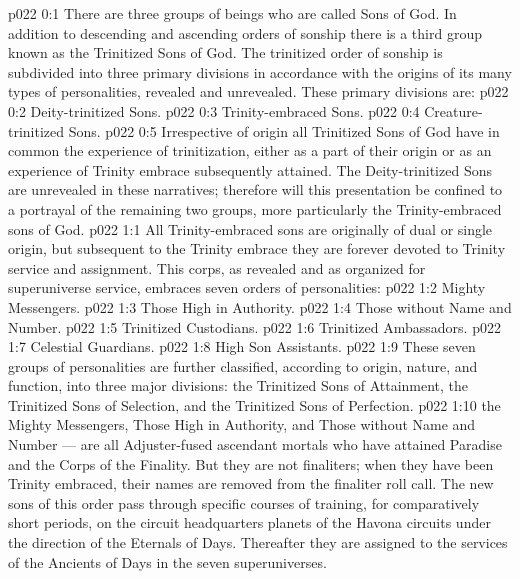 \author{Mighty Messenger}
\vs p022 0:1 There are three groups of beings who are called Sons of God. In addition to descending and ascending orders of sonship there is a third group known as the Trinitized Sons of God. The trinitized order of sonship is subdivided into three primary divisions in accordance with the origins of its many types of personalities, revealed and unrevealed. These primary divisions are:
\vs p022 0:2 \bibnobreakspace Deity\hyp{}trinitized Sons.
\vs p022 0:3 \bibnobreakspace Trinity\hyp{}embraced Sons.
\vs p022 0:4 \bibnobreakspace Creature\hyp{}trinitized Sons.
\vs p022 0:5 Irrespective of origin all Trinitized Sons of God have in common the experience of trinitization, either as a part of their origin or as an experience of Trinity embrace subsequently attained. The Deity\hyp{}trinitized Sons are unrevealed in these narratives; therefore will this presentation be confined to a portrayal of the remaining two groups, more particularly the Trinity\hyp{}embraced sons of God.
\vs p022 1:1 All Trinity\hyp{}embraced sons are originally of dual or single origin, but subsequent to the Trinity embrace they are forever devoted to Trinity service and assignment. This corps, as revealed and as organized for superuniverse service, embraces seven orders of personalities:
\vs p022 1:2 \bibnobreakspace Mighty Messengers.
\vs p022 1:3 \bibnobreakspace Those High in Authority.
\vs p022 1:4 \bibnobreakspace Those without Name and Number.
\vs p022 1:5 \bibnobreakspace Trinitized Custodians.
\vs p022 1:6 \bibnobreakspace Trinitized Ambassadors.
\vs p022 1:7 \bibnobreakspace Celestial Guardians.
\vs p022 1:8 \bibnobreakspace High Son Assistants.
\vs p022 1:9 \pc These seven groups of personalities are further classified, according to origin, nature, and function, into three major divisions: the Trinitized Sons of Attainment, the Trinitized Sons of Selection, and the Trinitized Sons of Perfection.
\vs p022 1:10 \pc {} the Mighty Messengers, Those High in Authority, and Those without Name and Number --- are all Adjuster\hyp{}fused ascendant mortals who have attained Paradise and the Corps of the Finality. But they are not finaliters; when they have been Trinity embraced, their names are removed from the finaliter roll call. The new sons of this order pass through specific courses of training, for comparatively short periods, on the circuit headquarters planets of the Havona circuits under the direction of the Eternals of Days. Thereafter they are assigned to the services of the Ancients of Days in the seven superuniverses.
